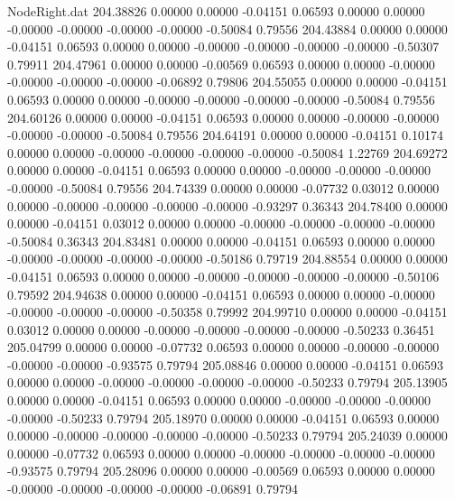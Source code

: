 \begin{filecontents}{NodeRight.dat}
 204.38826    0.00000    0.00000    -0.04151    0.06593    0.00000    0.00000   -0.00000   -0.00000   -0.00000   -0.00000   -0.50084    0.79556
 204.43884    0.00000    0.00000    -0.04151    0.06593    0.00000    0.00000   -0.00000   -0.00000   -0.00000   -0.00000   -0.50307    0.79911
 204.47961    0.00000    0.00000    -0.00569    0.06593    0.00000    0.00000   -0.00000   -0.00000   -0.00000   -0.00000   -0.06892    0.79806
 204.55055    0.00000    0.00000    -0.04151    0.06593    0.00000    0.00000   -0.00000   -0.00000   -0.00000   -0.00000   -0.50084    0.79556
 204.60126    0.00000    0.00000    -0.04151    0.06593    0.00000    0.00000   -0.00000   -0.00000   -0.00000   -0.00000   -0.50084    0.79556
 204.64191    0.00000    0.00000    -0.04151    0.10174    0.00000    0.00000   -0.00000   -0.00000   -0.00000   -0.00000   -0.50084    1.22769
 204.69272    0.00000    0.00000    -0.04151    0.06593    0.00000    0.00000   -0.00000   -0.00000   -0.00000   -0.00000   -0.50084    0.79556
 204.74339    0.00000    0.00000    -0.07732    0.03012    0.00000    0.00000   -0.00000   -0.00000   -0.00000   -0.00000   -0.93297    0.36343
 204.78400    0.00000    0.00000    -0.04151    0.03012    0.00000    0.00000   -0.00000   -0.00000   -0.00000   -0.00000   -0.50084    0.36343
 204.83481    0.00000    0.00000    -0.04151    0.06593    0.00000    0.00000   -0.00000   -0.00000   -0.00000   -0.00000   -0.50186    0.79719
 204.88554    0.00000    0.00000    -0.04151    0.06593    0.00000    0.00000   -0.00000   -0.00000   -0.00000   -0.00000   -0.50106    0.79592
 204.94638    0.00000    0.00000    -0.04151    0.06593    0.00000    0.00000   -0.00000   -0.00000   -0.00000   -0.00000   -0.50358    0.79992
 204.99710    0.00000    0.00000    -0.04151    0.03012    0.00000    0.00000   -0.00000   -0.00000   -0.00000   -0.00000   -0.50233    0.36451
 205.04799    0.00000    0.00000    -0.07732    0.06593    0.00000    0.00000   -0.00000   -0.00000   -0.00000   -0.00000   -0.93575    0.79794
 205.08846    0.00000    0.00000    -0.04151    0.06593    0.00000    0.00000   -0.00000   -0.00000   -0.00000   -0.00000   -0.50233    0.79794
 205.13905    0.00000    0.00000    -0.04151    0.06593    0.00000    0.00000   -0.00000   -0.00000   -0.00000   -0.00000   -0.50233    0.79794
 205.18970    0.00000    0.00000    -0.04151    0.06593    0.00000    0.00000   -0.00000   -0.00000   -0.00000   -0.00000   -0.50233    0.79794
 205.24039    0.00000    0.00000    -0.07732    0.06593    0.00000    0.00000   -0.00000   -0.00000   -0.00000   -0.00000   -0.93575    0.79794
 205.28096    0.00000    0.00000    -0.00569    0.06593    0.00000    0.00000   -0.00000   -0.00000   -0.00000   -0.00000   -0.06891    0.79794

\end{filecontents}
